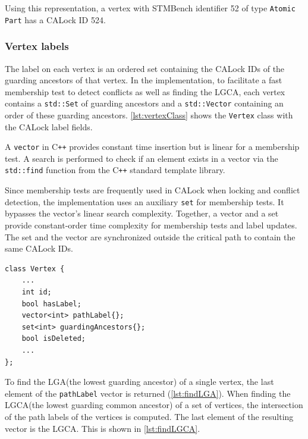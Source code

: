 Using this representation, a vertex with STMBench identifier 52 of type \texttt{Atomic Part} has a CALock ID 524.

\subsubsection{Vertex labels}

The label on each vertex is an ordered set containing the CALock IDs of the guarding ancestors of that vertex. In the implementation, to facilitate a fast membership test to detect conflicts as well as finding the LGCA, each vertex contains a \texttt{std::Set} of guarding ancestors and a \texttt{std::Vector} containing an order of these guarding ancestors.  \cref{lst:vertexClass} shows the \texttt{Vertex} class with the CALock label fields.

A \texttt{vector} in C\texttt{++} provides constant time insertion but is linear for a membership test. A search is performed to check if an element exists in a vector via the \texttt{std::find} function from the C\texttt{++} standard template library.

Since membership tests are frequently used in CALock when locking and conflict detection, the implementation uses an auxiliary \texttt{set} for membership tests. It bypasses the vector's linear search complexity. Together, a vector and a set provide constant-order time complexity for membership tests and label updates. The set and the vector are synchronized outside the critical path to contain the same CALock IDs.

\begin{lstlisting}[caption={Vertex class with CALock label fields.}, label={lst:vertexClass}]
class Vertex {
    ...
    int id;
    bool hasLabel;
    vector<int> pathLabel{};
    set<int> guardingAncestors{};
    bool isDeleted;
    ...
};

\end{lstlisting}


To find the LGA(the lowest guarding ancestor) of a single vertex, the last element of the \lstinline{pathLabel} vector is returned (\cref{lst:findLGA}). When finding the LGCA(the lowest guarding common ancestor) of a set of vertices, the intersection of the path labels of the vertices is computed. The last element of the resulting vector is the LGCA. This is shown in \cref{lst:findLGCA}.

